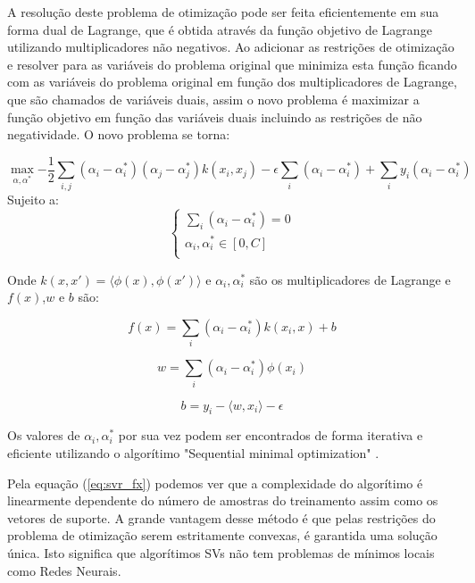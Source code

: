 A resolução deste problema de otimização pode ser feita eficientemente em sua forma dual de Lagrange, que é obtida através da função objetivo de Lagrange utilizando multiplicadores não negativos. Ao adicionar as restrições de otimização e resolver para as variáveis do problema original que minimiza esta função ficando com as variáveis do problema original em função dos multiplicadores de Lagrange, que são chamados de variáveis duais, assim o novo problema é maximizar a função objetivo em função das variáveis duais incluindo as restrições de não negatividade. O novo problema se torna:

\begin{equation}
\label{eq:svr_dual}
\max_{\alpha,\alpha^*}{-\frac{1}{2}\sum_{i,j}{(\alpha_i-\alpha_i^*)(\alpha_j-\alpha_j^*)k(x_i,x_j)}-\epsilon \sum_{i}{(\alpha_i-\alpha_i^*)}+\sum_{i}{y_i(\alpha_i-\alpha_i^*)}}
\end{equation}
Sujeito a:
\[
\begin{cases} 
      \sum_{i}{(\alpha_i-\alpha_i^*)}=0\\
      \alpha_i,\alpha_i^* \in [0,C] \\
   \end{cases}
\]

Onde $k(x,x')=\langle \phi(x), \phi(x') \rangle$ e $\alpha_i,\alpha_i^*$ são os multiplicadores de Lagrange e $f(x)$,$w$ e $b$ são:

\begin{equation}
\label{eq:svr_fx}
f(x)= \sum_{i}{(\alpha_i-\alpha_i^*)k(x_i,x)}+b
\end{equation}

\begin{equation}
\label{eq:svr_w}
w= \sum_{i}{(\alpha_i-\alpha_i^*)\phi(x_i)}
\end{equation}

\begin{equation}
\label{eq:svr_b}
b= y_i-\langle w,x_i \rangle-\epsilon
\end{equation}

Os valores de $\alpha_i,\alpha_i^*$ por sua vez podem ser encontrados de forma iterativa e eficiente utilizando o algorítimo "Sequential minimal optimization" \cite{Platt1998}.

Pela equação (\ref{eq:svr_fx}) podemos ver que a complexidade do algorítimo é linearmente dependente do número de amostras do treinamento assim como os vetores de suporte. A grande vantagem desse método é que pelas restrições do problema de otimização serem estritamente convexas, é garantida uma solução única. Isto significa que algorítimos SVs não tem problemas de mínimos locais como Redes Neurais.


